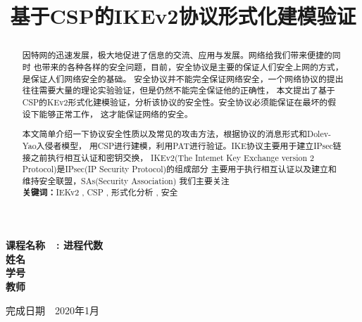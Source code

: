 \documentclass[UTF8]{ctexart}
\begin{document}
              
	\title{\textbf{基于CSP的IKEv2协议形式化建模验证}\\[1ex]\begin{large}
		\end{large}
		\date{}
		}
	\begin{titlepage}
        \heiti
        \vspace*{64pt}
        \begin{center}
          
        
            \fontsize{36pt}{0} \textbf{课程名称\ \ : 进程代数}\\
            \vspace*{72pt}
			\vspace*{36pt}
			\vspace*{72pt}			
			\Large \textbf{姓名\ \ \underline{}}\ \ \\
			\Large \textbf{学号\ \ \underline{}}\\
			\Large \textbf{教师\ \ \underline{}}
			
			\vspace*{36pt}
			\vspace*{72pt}	

			\Large 完成日期\ \ 2020年1月
        \end{center}
    \end{titlepage}
	\maketitle
\begin{abstract} 
	\par{因特网的迅速发展，极大地促进了信息的交流、应用与发展。网络给我们带来便捷的同时
	也带来的各种各样的安全问题，目前，安全协议是主要的保证人们安全上网的方式，是保证人们网络安全的基础。
	安全协议并不能完全保证网络安全，一个网络协议的提出往往需要大量的理论实验验证，但是仍然不能完全保证他的正确性，
	本文提出了基于CSP的KEv2形式化建模验证，分析该协议的安全性。安全协议必须能保证在最坏的假设下能够正常工作，
	这才能保证网络的安全。
	}
	\par{本文简单介绍一下协议安全性质以及常见的攻击方法，根据协议的消息形式和Dolev-Yao入侵者模型，
	用CSP进行建模，利用PAT进行验证。IKE协议主要用于建立IPsec链接之前执行相互认证和密钥交换，
	IKEv2(The Intemet Key Exchange version 2 Protocol)是IPsec(IP Security Protocol)的组成部分
	主要用于执行相互认证以及建立和维持安全联盟，SAs(Security Association)
	我们主要关注}
	\\
	\textbf{关键词：}IEKv2 , CSP ,  形式化分析 , 安全
\end{abstract}
\end{document}
